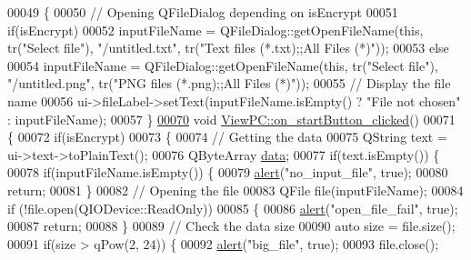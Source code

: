 \begin{DoxyCode}
00049 \{
00050     \textcolor{comment}{// Opening QFileDialog depending on isEncrypt}
00051     \textcolor{keywordflow}{if}(isEncrypt)
00052         inputFileName = QFileDialog::getOpenFileName(\textcolor{keyword}{this}, tr(\textcolor{stringliteral}{"Select file"}), \textcolor{stringliteral}{"/untitled.txt"}, tr(\textcolor{stringliteral}{"Text
       files (*.txt);;All Files (*)"}));
00053     \textcolor{keywordflow}{else}
00054         inputFileName = QFileDialog::getOpenFileName(\textcolor{keyword}{this}, tr(\textcolor{stringliteral}{"Select file"}), \textcolor{stringliteral}{"/untitled.png"}, tr(\textcolor{stringliteral}{"PNG
       files (*.png);;All Files (*)"}));
00055     \textcolor{comment}{// Display the file name}
00056     ui->fileLabel->setText(inputFileName.isEmpty() ? \textcolor{stringliteral}{"File not chosen"} : inputFileName);
00057 \}
\hypertarget{viewpc_8cpp_source.tex_l00070}{}\hyperlink{class_view_p_c_a456d75b7c5d3a089302a576e7359f1f4}{00070} \textcolor{keywordtype}{void} \hyperlink{class_view_p_c_a456d75b7c5d3a089302a576e7359f1f4}{ViewPC::on\_startButton\_clicked}()
00071 \{
00072     \textcolor{keywordflow}{if}(isEncrypt)
00073     \{
00074         \textcolor{comment}{// Getting the data}
00075         QString text = ui->text->toPlainText();
00076         QByteArray \hyperlink{namespace_errors_dict_setup_af570460846fb9f0c91abd308a095dcdc}{data};
00077         \textcolor{keywordflow}{if}(text.isEmpty()) \{
00078             \textcolor{keywordflow}{if}(inputFileName.isEmpty()) \{
00079                 \hyperlink{class_view_p_c_a7c467169467789561078abc9d4fe57bd}{alert}(\textcolor{stringliteral}{"no\_input\_file"}, \textcolor{keyword}{true});
00080                 \textcolor{keywordflow}{return};
00081             \}
00082             \textcolor{comment}{// Opening the file}
00083             QFile file(inputFileName);
00084             \textcolor{keywordflow}{if} (!file.open(QIODevice::ReadOnly))
00085             \{
00086                 \hyperlink{class_view_p_c_a7c467169467789561078abc9d4fe57bd}{alert}(\textcolor{stringliteral}{"open\_file\_fail"}, \textcolor{keyword}{true});
00087                 \textcolor{keywordflow}{return};
00088             \}
00089             \textcolor{comment}{// Check the data size}
00090             \textcolor{keyword}{auto} size = file.size();
00091             \textcolor{keywordflow}{if}(size > qPow(2, 24)) \{
00092                 \hyperlink{class_view_p_c_a7c467169467789561078abc9d4fe57bd}{alert}(\textcolor{stringliteral}{"big\_file"}, \textcolor{keyword}{true});
00093                 file.close();

\end{DoxyCode}
